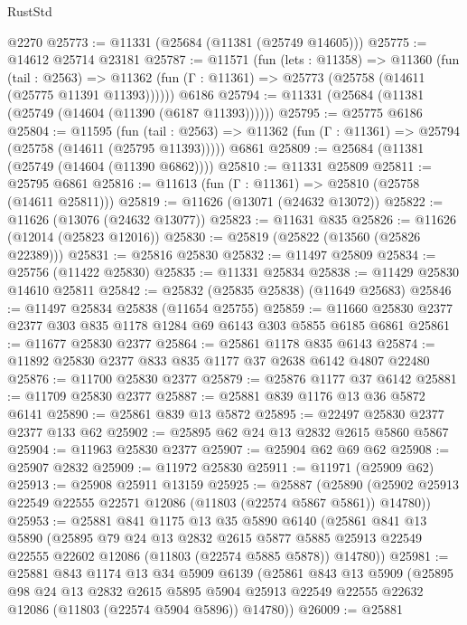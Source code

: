 \begin{lexlean}{RustStd}
\begin{coremodule}
    @2270
@25773 := @11331 (@25684 (@11381 (@25749 @14605)))
@25775 := @14612 @25714 @23181
@25787 := @11571
    (fun (lets : @11358) =>
    @11360
      (fun (tail : @2563) =>
      @11362 (fun (Γ : @11361) => @25773 (@25758 (@14611 (@25775 @11391 @11393))))))
    @6186
@25794 := @11331 (@25684 (@11381 (@25749 (@14604 (@11390 (@6187 @11393))))))
@25795 := @25775 @6186
@25804 := @11595
    (fun (tail : @2563) => @11362 (fun (Γ : @11361) => @25794 (@25758 (@14611 (@25795 @11393)))))
    @6861
@25809 := @25684 (@11381 (@25749 (@14604 (@11390 @6862))))
@25810 := @11331 @25809
@25811 := @25795 @6861
@25816 := @11613 (fun (Γ : @11361) => @25810 (@25758 (@14611 @25811)))
@25819 := @11626 (@13071 (@24632 @13072))
@25822 := @11626 (@13076 (@24632 @13077))
@25823 := @11631 @835
@25826 := @11626 (@12014 (@25823 @12016))
@25830 := @25819 (@25822 (@13560 (@25826 @22389)))
@25831 := @25816 @25830
@25832 := @11497 @25809
@25834 := @25756 (@11422 @25830)
@25835 := @11331 @25834
@25838 := @11429 @25830 @14610 @25811
@25842 := @25832 (@25835 @25838) (@11649 @25683)
@25846 := @11497 @25834 @25838 (@11654 @25755)
@25859 := @11660 @25830 @2377 @2377 @303 @835 @1178 @1284 @69 @6143 @303 @5855 @6185 @6861
@25861 := @11677 @25830 @2377
@25864 := @25861 @1178 @835 @6143
@25874 := @11892 @25830 @2377 @833 @835 @1177 @37 @2638 @6142 @4807 @22480
@25876 := @11700 @25830 @2377
@25879 := @25876 @1177 @37 @6142
@25881 := @11709 @25830 @2377
@25887 := @25881 @839 @1176 @13 @36 @5872 @6141
@25890 := @25861 @839 @13 @5872
@25895 := @22497 @25830 @2377 @2377 @133 @62
@25902 := @25895 @62 @24 @13 @2832 @2615 @5860 @5867
@25904 := @11963 @25830 @2377
@25907 := @25904 @62 @69 @62
@25908 := @25907 @2832
@25909 := @11972 @25830
@25911 := @11971 (@25909 @62)
@25913 := @25908 @25911 @13159
@25925 := @25887
    (@25890 (@25902 @25913 @22549 @22555 @22571 @12086 (@11803 (@22574 @5867 @5861)) @14780))
@25953 := @25881
    @841
    @1175
    @13
    @35
    @5890
    @6140
    (@25861
      @841
      @13
      @5890
      (@25895
        @79
        @24
        @13
        @2832
        @2615
        @5877
        @5885
        @25913
        @22549
        @22555
        @22602
        @12086
        (@11803 (@22574 @5885 @5878))
        @14780))
@25981 := @25881
    @843
    @1174
    @13
    @34
    @5909
    @6139
    (@25861
      @843
      @13
      @5909
      (@25895
        @98
        @24
        @13
        @2832
        @2615
        @5895
        @5904
        @25913
        @22549
        @22555
        @22632
        @12086
        (@11803 (@22574 @5904 @5896))
        @14780))
@26009 := @25881

\end{coremodule}
\end{lexlean}
